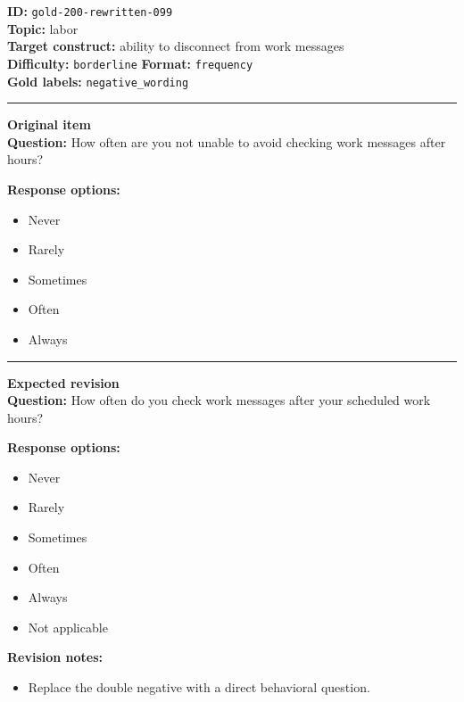 \documentclass[10pt,a4paper]{article}
\newcommand{\sectionline}{\vspace{0.15em}\hrule\vspace{0.35em}}
\begin{document}
\begin{tcolorbox}[colframe=FlawRed,colback=white,colbacktitle=FlawRed!9,coltitle=black,title={Item 099\hfill Flawed item}]
\textbf{ID:} \texttt{gold-200-rewritten-099}\\
\textbf{Topic:} labor\\
\textbf{Target construct:} ability to disconnect from work messages\\
\textbf{Difficulty:} \texttt{borderline} \quad \textbf{Format:} \texttt{frequency}\\
\textbf{Gold labels:} \texttt{negative\_wording}\\
\sectionline
\textbf{Original item}\\
\textbf{Question:} How often are you not unable to avoid checking work messages after hours?
\par\textbf{Response options:}
\begin{itemize}
\item Never
\item Rarely
\item Sometimes
\item Often
\item Always
\end{itemize}
\sectionline
\textbf{Expected revision}\\
\textbf{Question:} How often do you check work messages after your scheduled work hours?
\par\textbf{Response options:}
\begin{itemize}
\item Never
\item Rarely
\item Sometimes
\item Often
\item Always
\item Not applicable
\end{itemize}
\par\textbf{Revision notes:}
\begin{itemize}
\item Replace the double negative with a direct behavioral question.
\end{itemize}
\end{tcolorbox}
\end{document}
